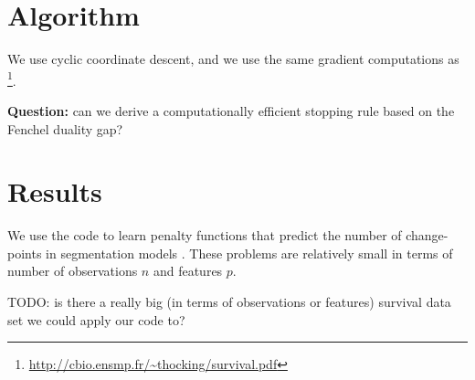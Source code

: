 \documentclass[article]{jss}
\begin{document}
\section{Algorithm}

We use cyclic coordinate descent, and we use the same gradient
computations as \citet[sections
6.7--6.9]{survival-manual}\footnote{\url{http://cbio.ensmp.fr/~thocking/survival.pdf}}.

\textbf{Question:} can we derive a computationally efficient stopping
rule based on the Fenchel duality gap?

\section{Results}

We use the code to learn penalty functions that predict the number of
change-points in segmentation models \citep{HOCKING-penalties,
  PeakSeg}. These problems are relatively small in terms of number of
observations $n$ and features $p$.

TODO: is there a really big (in terms of observations or features)
survival data set we could apply our code to?


\end{document}
